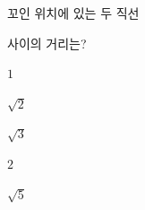 꼬인 위치에 있는 두 직선 \par\smallskip{}\par\smallskip\noindent 사이의 거리는?
\begin{choices32}{\rule[-3ex]{0pt}{8ex}$1$}{\rule[-3ex]{0pt}{8ex}$\sqrt{2}$}{\rule[-3ex]{0pt}{8ex}$\sqrt{3}$}{\rule[-3ex]{0pt}{8ex}$2$}{\rule[-3ex]{0pt}{8ex}$\sqrt{5}$}\end{choices32}
